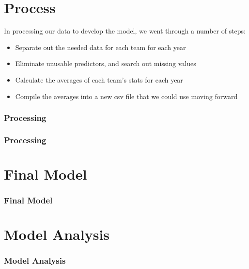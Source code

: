 \documentclass[11pt]{beamer}
\begin{document}
\section{Process}
\begin{frame}
In processing our data to develop the model, we went through a number of steps:
\begin{itemize}
	\footnotesize
	\item Separate out the needed data for each team for each year
	\item Eliminate unusable predictors, and search out missing values
	\item Calculate the averages of each team's stats for each year
	\item Compile the averages into a new csv file that we could use moving forward
\end{itemize}
\frametitle{{\textbf{\huge Processing}}}
\end{frame}
\begin{frame}
\frametitle{{\textbf{\huge Processing}}}
\end{frame}
\section{Final Model}
\begin{frame}
\frametitle{{\textbf{\huge Final Model}}}
\end{frame}
\section{Model Analysis}
\begin{frame}
\frametitle{{\textbf{\huge Model Analysis}}}
\end{frame}
\end{document}
